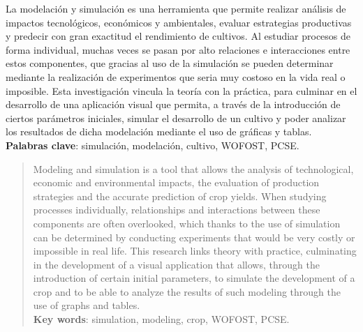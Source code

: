 \begin{resumen}
	La modelación y simulación es una herramienta que permite realizar análisis de impactos tecnológicos, económicos y ambientales, evaluar estrategias productivas y predecir con gran exactitud el rendimiento de cultivos. Al estudiar procesos de forma individual, muchas veces se pasan por alto relaciones e interacciones entre estos componentes, que gracias al uso de la simulación se pueden determinar mediante la realización de experimentos que seria muy costoso en la vida real o imposible. Esta investigación vincula la teoría con la práctica, para culminar en el desarrollo de una aplicación visual que permita, a través de la introducción de ciertos parámetros iniciales, simular el desarrollo de un cultivo y poder analizar los resultados de dicha modelación mediante el uso de gráficas y tablas.\\
	
	\textbf{Palabras clave}: simulación, modelación, cultivo, WOFOST, PCSE.
\end{resumen}

\begin{abstract}
	Modeling and simulation is a tool that allows the analysis of technological, economic and environmental impacts, the evaluation of production strategies and the accurate prediction of crop yields. When studying processes individually, relationships and interactions between these components are often overlooked, which thanks to the use of simulation can be determined by conducting experiments that would be very costly or impossible in real life. This research links theory with practice, culminating in the development of a visual application that allows, through the introduction of certain initial parameters, to simulate the development of a crop and to be able to analyze the results of such modeling through the use of graphs and tables.\\
	
	\textbf{Key words}: simulation, modeling, crop, WOFOST, PCSE.
\end{abstract}